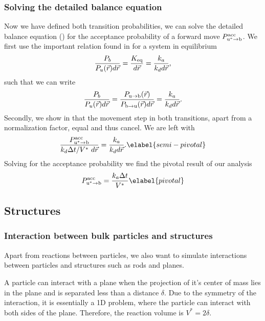 \subsubsection{Solving the detailed balance equation}
Now we have defined both transition probabilities, we can solve the detailed balance equation () for the acceptance probability of a forward move $P^{\rm acc}_{{\rm u}^* \rightarrow {\rm b}}$. We first use the important relation found in \cite{Morelli2008a} for a system in equilibrium
\begin{equation}
 \frac{P_b}{P_u(\vec{r})d\vec{r}} = \frac{K_{\rm eq}}{d\vec{r}} = \frac{k_a}{k_d d\vec{r}},
\end{equation}
such that we can write
\begin{equation}
 \frac{P_b}{P_u(\vec{r})d\vec{r}} = \frac{P_{ \rm{u} \rightarrow \rm{b} }(\vec{r})}{P_{ \rm{b} \rightarrow \rm{u} }(\vec{r})d\vec{r}} = \frac{k_a}{k_d d\vec{r}}.
\end{equation}
Secondly, we show in  that the movement step in both transitions, apart from a normalization factor, equal and thus cancel. We are left with
\begin{equation}
 \frac{P^{\rm acc}_{{\rm u}^* \rightarrow {\rm b}}}{k_d \Delta t/V^* \,\, d\vec{r}} = \frac{k_a}{k_d d\vec{r}}.
\elabel{semi-pivotal}
\end{equation}
Solving for the acceptance probability we find the pivotal result of our analysis
\begin{equation}
 P^{\rm acc}_{{\rm u}^* \rightarrow {\rm b}} = \frac{k_a \Delta t}{V^*}
\elabel{pivotal}
\end{equation}

\subsection{Structures}

\subsubsection{Interaction between bulk particles and structures}
Apart from reactions between particles, we also want to simulate interactions between particles and structures such as rods and planes. 

A particle can interact with a plane when the projection of it's center of mass lies in the plane and is separated less than a distance $\delta$. Due to the symmetry of the interaction, it is essentially a 1D problem, where the particle can interact with both sides of the plane. Therefore, the reaction volume is $V^*=2 \delta$.

